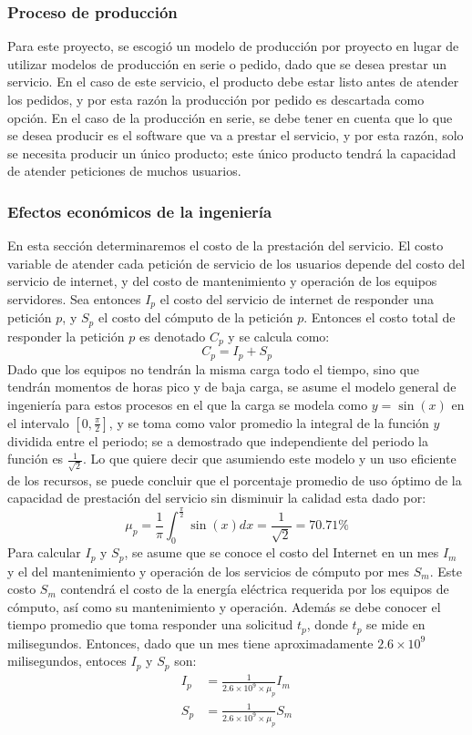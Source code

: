 \documentclass[a4paper, 12pt, oneside]{article}
\begin{document}
	\subsubsection{Proceso de producción}
	Para este proyecto, se escogió un modelo de producción por proyecto en lugar de utilizar modelos de producción en serie o pedido, dado que se desea prestar un servicio. En el caso de este servicio, el producto debe estar listo antes de atender los pedidos, y por esta razón la producción por pedido es descartada como opción. En el caso de la producción en serie, se debe tener en cuenta que lo que se desea producir es el software que va a prestar el servicio, y por esta razón, solo se necesita producir un único producto; este único producto tendrá la capacidad de atender peticiones de muchos usuarios.

	\subsubsection{Efectos económicos de la ingeniería}
	En esta sección determinaremos el costo de la prestación del servicio. El costo variable de atender cada petición de servicio de los usuarios depende del costo del servicio de internet, y del costo de mantenimiento y operación de los equipos servidores.\newline
	Sea entonces $I_p$ el costo del servicio de internet de responder una petición $p$, y $S_p$ el costo del cómputo de la petición $p$. Entonces el costo total de responder la petición $p$ es denotado $C_p$ y se calcula como:
	\begin{equation}
		C_p = I_p + S_p
		\label{eq:opCost}
	\end{equation}
	Dado que los equipos no tendrán la misma carga todo el tiempo, sino que tendrán momentos de horas pico y de baja carga, se asume el modelo general de ingeniería para estos procesos en el que la carga se modela como $y=\sin(x)$ en el intervalo $[0,\frac{\pi}{2}]$, y se toma como valor promedio la integral de la función $y$ dividida entre el periodo; se a demostrado que independiente del periodo la función es $\frac{1}{\sqrt{2}}$. Lo que quiere decir que asumiendo este modelo y un uso eficiente de los recursos, se puede concluir que el porcentaje promedio de uso óptimo de la capacidad de prestación del servicio sin disminuir la calidad esta dado por:
	\[ \mu_p=\frac{1}{\pi}\int_0^{\frac{\pi}{2}}{\sin(x)dx} = \frac{1}{\sqrt{2}} = 70.71\% \]
	Para calcular $I_p$ y $S_p$, se asume que se conoce el costo del Internet en un mes $I_m$ y el del mantenimiento y operación de los servicios de cómputo por mes $S_m$. Este costo $S_m$ contendrá el costo de la energía eléctrica requerida por los equipos de cómputo, así como su mantenimiento y operación. Además se debe conocer el tiempo promedio que toma responder una solicitud $t_p$, donde $t_p$ se mide en milisegundos. Entonces, dado que un mes tiene aproximadamente $2.6 \times 10^9$ milisegundos, entoces $I_p$ y $S_p$ son:
	\begin{align}
		I_p &= \frac{1}{2.6 \times 10^9 \times \mu_p}I_m \\
		S_p &= \frac{1}{2.6 \times 10^9 \times \mu_p}S_m
	\end{align}
\end{document}
